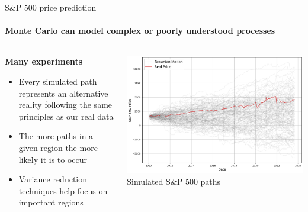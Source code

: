 \documentclass{beamer}
\begin{document}
\begin{frame}{S\&P 500 price prediction}
  \framesubtitle{Monte Carlo can model complex or poorly understood processes}
  \begin{columns}[c]
    \begin{column}{0.4\textwidth}
      \textbf{Many experiments}
      \begin{itemize}
        \item Every simulated path represents an alternative reality following the same principles as our real data
        \item The more paths in a given region the more likely it is to occur
        \item Variance reduction techniques help focus on important regions
      \end{itemize}
    \end{column}
    \begin{column}{0.6\textwidth}
      \begin{center}
        \includegraphics[width=\textwidth]{images/brownian_paths.png}
        \\[0.2cm]
        \small{Simulated S\&P 500 paths}
      \end{center}
    \end{column}
  \end{columns}
\end{frame}
\end{document}
